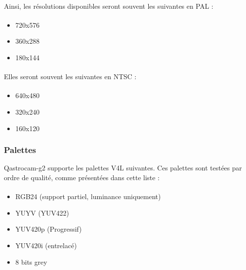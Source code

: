 \documentclass[11pt,a4paper]{book}
\begin{document}
\paragraph*{}
Ainsi, les r\'esolutions disponibles seront souvent les suivantes en PAL :

\paragraph*{}
\begin{itemize}
\item 720x576
\item 360x288
\item 180x144
\end{itemize}

\paragraph*{}
Elles seront souvent les suivantes en NTSC :

\paragraph*{}
\begin{itemize}
\item 640x480
\item 320x240
\item 160x120
\end{itemize}

\subsubsection{Palettes}

Qastrocam-g2 supporte les palettes V4L suivantes. Ces palettes sont test\'ees par ordre de qualit\'e,
comme pr\'esent\'ees dans cette liste :

\paragraph*{}
\begin{itemize}
\item RGB24 (support partiel, luminance uniquement)
\item YUYV (YUV422)
\item YUV420p (Progressif)
\item YUV420i (entrelac\'e)
\item 8 bits grey
\end{itemize}
\end{document}
